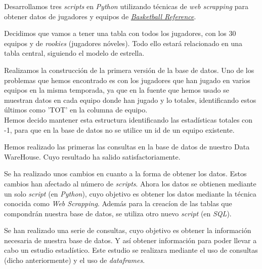 \documentclass[idxtotoc,hyperref,openany]{labbook} %
\begin{document}

Desarrollamos tres \textit{scripts} en \textit{Python} utilizando técnicas de \textit{web scrapping} para obtener datos de jugadores y equipos de \href{https://www.basketball-reference.com/leagues/NBA_2019.html}{\textit{Basketball Reference}}.


Decidimos que vamos a tener una tabla con todos los jugadores, con los 30 equipos y de \textit{rookies} (jugadores nóveles). Todo ello estará relacionado en una tabla central, siguiendo el modelo de estrella.



Realizamos la construcción de la primera versión de la base de datos. Uno de los problemas que hemos encontrado es con los jugadores que han jugado en varios equipos en la misma temporada, ya que en la fuente que hemos usado se muestran datos en cada equipo donde han jugado y lo totales, identificando estos últimos como 'TOT' en la columna de equipo.\\

Hemos decido mantener esta estructura identificando las estadísticas totales con -1, para que en la base de datos no se utilice un id de un equipo existente.

Hemos realizado las primeras las consultas en la base de datos de nuestro Data WareHouse. 
Cuyo resultado ha salido satisfactoriamente.



Se ha realizado unos cambios en cuanto a la forma de obtener los datos. Estos cambios han afectado al número de \textit{scripts}. Ahora los datos se obtienen mediante un solo \textit{script} (en \textit{Python}), cuyo objetivo es obtener los datos mediante la técnica conocida como \textit{Web Scrapping}. Además para la creacíon de las tablas que compondrán nuestra base de datos, se utiliza otro nuevo \textit{script} (en \textit{SQL}).

Se han realizado una serie de consultas, cuyo objetivo es obtener la información necesaria de nuestra base de datos. Y así obtener información para poder llevar a cabo un estudio estadístico.
Este estudio se realizara mediante el uso de consultas (dicho anteriormente) y el uso de \textit{dataframes}.
\end{document}
